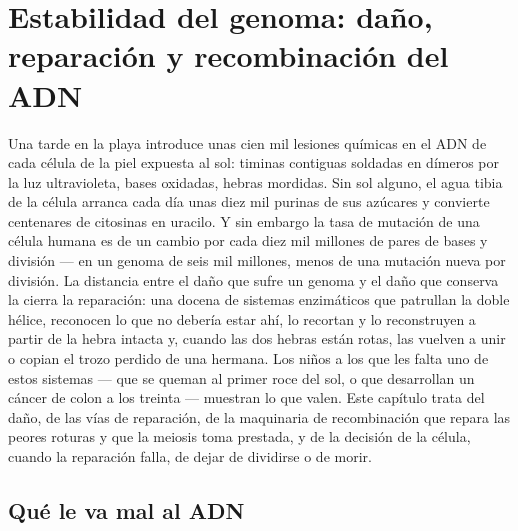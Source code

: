 \chapter{Estabilidad del genoma: daño, reparación y recombinación del ADN}\label{ch:b3:dna-repair}

Una tarde en la playa introduce unas cien mil lesiones químicas en el ADN
de cada célula de la piel expuesta al sol: timinas contiguas soldadas en
dímeros por la luz ultravioleta, bases oxidadas, hebras mordidas. Sin sol
alguno, el agua tibia de la célula arranca cada día unas diez mil purinas
de sus azúcares y convierte centenares de citosinas en uracilo. Y sin
embargo la tasa de mutación de una célula humana es de un cambio por cada
diez mil millones de pares de bases y división --- en un genoma de seis
mil millones, menos de una mutación nueva por división. La distancia
entre el daño que sufre un genoma y el daño que conserva la cierra la
reparación: una docena de sistemas enzimáticos que patrullan la doble
hélice, reconocen lo que no debería estar ahí, lo recortan y lo
reconstruyen a partir de la hebra intacta y, cuando las dos hebras están
rotas, las vuelven a unir o copian el trozo perdido de una hermana. Los
niños a los que les falta uno de estos sistemas --- que se queman al
primer roce del sol, o que desarrollan un cáncer de colon a los treinta
--- muestran lo que valen. Este capítulo trata del daño, de las vías de
reparación, de la maquinaria de recombinación que repara las peores
roturas y que la meiosis toma prestada, y de la decisión de la célula,
cuando la reparación falla, de dejar de dividirse o de morir.

\section{Qué le va mal al ADN}


